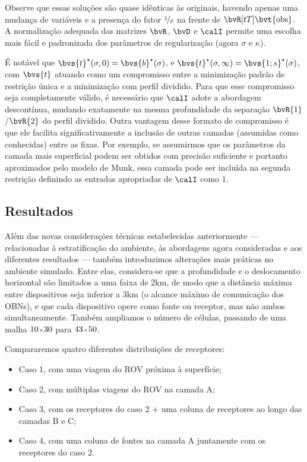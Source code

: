 Observe que essas soluções são quase idênticas às originais, havendo apenas uma mudança de variáveis e a presença do fator $\nicefrac{1}{\rho}$ na frente de $\bvR[tT] \bvt{\obs}$. A normalização adequada das matrizes $\bvR$, $\bvD$ e $\calI$ permite uma escolha mais fácil e padronizada dos parâmetros de regularização (agora $\sigma$ e $\kappa$).

É notável que $\opt{\bvs{t}}(\sigma,0) = \opt{\bvs{b}}(\sigma)$, e $\opt{\bvs{t}}(\sigma,\infty) = \opt{\bvs{1;s}}(\sigma)$, com $\bvs{t}$ atuando como um compromisso entre a minimização padrão de restrição única e a minimização com perfil dividido. Para que esse compromisso seja completamente válido, é necessário que $\calI$ adote a abordagem descontínua, mudando exatamente na mesma profundidade da separação $\bvR{1}$/$\bvR{2}$ do perfil dividido. Outra vantagem desse formato de compromisso é que ele facilita significativamente a inclusão de outras camadas (assumidas como conhecidas) entre as fixas. Por exemplo, se assumirmos que os parâmetros da camada mais superficial podem ser obtidos com precisão suficiente e portanto aproximados pelo modelo de Munk, essa camada pode ser incluída na segunda restrição definindo as entradas apropriadas de $\calI$ como $1$.

\subsection{Resultados}

Além das novas considerações técnicas estabelecidas anteriormente --- relacionadas à estratificação do ambiente, às abordagens agora consideradas e aos diferentes resultados --- também introduzimos alterações mais práticas no ambiente simulado. Entre elas, considera-se que a profundidade e o deslocamento horizontal são limitados a uma faixa de $2\si{\kilo\meter}$, de modo que a distância máxima entre dispositivos seja inferior a $3\si{\kilo\meter}$ (o alcance máximo de comunicação dos OBNs), e que cada dispositivo opere como fonte ou receptor, mas não ambos simultaneamente. Também ampliamos o número de células, passando de uma malha $\sz{10}{30}$ para $\sz{43}{50}$.

Compararemos quatro diferentes distribuições de receptores:
\begin{itemize}
	\item Caso 1, com uma viagem do ROV próxima à superfície;
	\item Caso 2, com múltiplas viagens do ROV na camada A;
	\item Caso 3, com os receptores do caso 2 + uma coluna de receptores ao longo das camadas B e C;
	\item Caso 4, com uma coluna de fontes na camada A juntamente com os receptores do caso 2.
\end{itemize}

